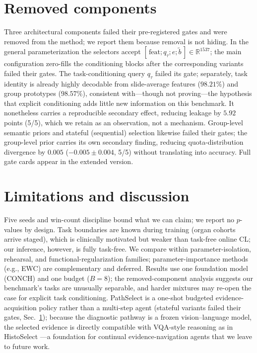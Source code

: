 \documentclass{article}
\begin{document}
\section{Removed components}
\label{sec:removed}
Three architectural components failed their pre-registered gates and were removed from the method; we report them because removal is not hiding. In the general parameterization the selectors accept $[\,\mathrm{feat};q_\tau;e;\tilde b\,]\in\mathbb{R}^{1537}$; the main configuration zero-fills the conditioning blocks after the corresponding variants failed their gates. The task-conditioning query $q_\tau$ failed its gate; separately, task identity is already highly decodable from slide-average features ($98.21\%$) and group prototypes ($98.57\%$), consistent with---though not proving---the hypothesis that explicit conditioning adds little new information on this benchmark. It nonetheless carries a reproducible secondary effect, reducing leakage by $5.92$ points (5/5), which we retain as an observation, not a mechanism. Group-level semantic priors and stateful (sequential) selection likewise failed their gates; the group-level prior carries its own secondary finding, reducing quota-distribution divergence by $0.005$ ($-0.005{\pm}0.004$, 5/5) without translating into accuracy. Full gate cards appear in the extended version.

\section{Limitations and discussion}
\label{sec:limitations}
Five seeds and win-count discipline bound what we can claim; we report no $p$-values by design. Task boundaries are known during training (organ cohorts arrive staged), which is clinically motivated but weaker than task-free online CL; our inference, however, is fully task-free. We compare within parameter-isolation, rehearsal, and functional-regularization families; parameter-importance methods (e.g., EWC) are complementary and deferred. Results use one foundation model (CONCH) and one budget ($B{=}8$); the removed-component analysis suggests our benchmark's tasks are unusually separable, and harder mixtures may re-open the case for explicit task conditioning. PathSelect is a one-shot budgeted evidence-acquisition policy rather than a multi-step agent (stateful variants failed their gates, Sec.~\ref{sec:removed}); because the diagnostic pathway is a frozen vision--language model, the selected evidence is directly compatible with VQA-style reasoning as in HistoSelect \cite{huang2026histoselect}---a foundation for continual evidence-navigation agents that we leave to future work.
\end{document}
